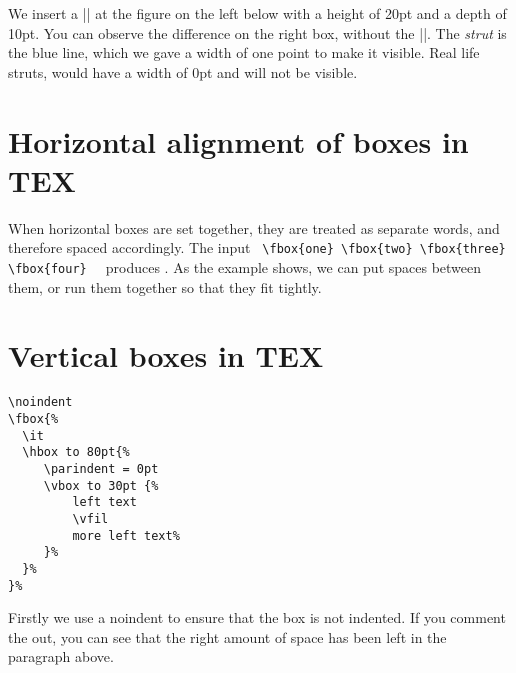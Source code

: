 {\begin{teX}
  \def \strut {\vrule height 8.5pt depth 3.5pt width 0pt}
\end{teX}

We insert a |\vrule| at the figure on the left below with a height of 20pt and a depth of 10pt. You can observe the difference on the right box, without the |\vrule|. The \textit{strut} is the blue line, which we gave a width of one point to make it visible. Real life struts, would have a width of 0pt and will not be visible. 




\section{Horizontal alignment of boxes in TEX}

When horizontal boxes are set together, they are treated as separate words,
and therefore spaced accordingly. The input
\verb+ \fbox{one} \fbox{two} \fbox{three} \fbox{four}  +
produces     . As the example shows, we can put spaces
between them, or run them together so that they fit tightly.


\section{Vertical boxes in TEX}


\begin{minipage}{2.0in}
\begin{verbatim}
\noindent
\fbox{%
  \it
  \hbox to 80pt{%
     \parindent = 0pt
     \vbox to 30pt {%
         left text
         \vfil
         more left text%
     }%
  }%
}%
\end{verbatim}
\end{minipage}


{}%

Firstly we use a noindent to ensure that the box is not indented. If you comment the out, you can see that the right amount of space has been left in the paragraph above.

\mbox{}
 
\noindent
{}%



}
